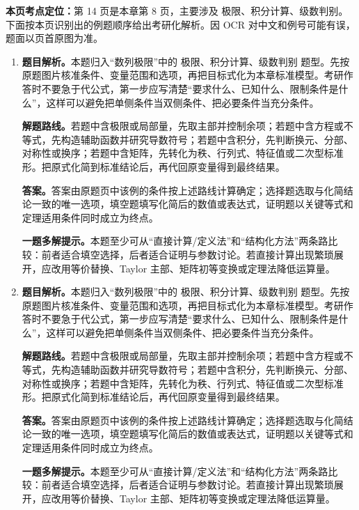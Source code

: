 \begin{solutionblock}
\textbf{本页考点定位：}第 14 页是本章第 8 页，主要涉及 极限、积分计算、级数判别。下面按本页识别出的例题顺序给出考研化解析。因 OCR 对中文和例号可能有误，题面以页首原图为准。

\begin{enumerate}[label=\textbf{例\arabic*.}, leftmargin=2.4em]

\item \textbf{题目解析。}本题归入“数列极限”中的 极限、积分计算、级数判别 题型。先按原题图片核准条件、变量范围和选项，再把目标式化为本章标准模型。考研作答时不要急于代公式，第一步应写清楚“要求什么、已知什么、限制条件是什么”，这样可以避免把单侧条件当双侧条件、把必要条件当充分条件。

\textbf{解题路线。}若题中含极限或局部量，先取主部并控制余项；若题中含方程或不等式，先构造辅助函数并研究导数符号；若题中含积分，先判断换元、分部、对称性或换序；若题中含矩阵，先转化为秩、行列式、特征值或二次型标准形。把原式化简到标准结论后，再代回原变量得到最终结果。

\textbf{答案。}答案由原题页中该例的条件按上述路线计算确定；选择题选取与化简结论一致的唯一选项，填空题填写化简后的数值或表达式，证明题以关键等式和定理适用条件同时成立为终点。

\textbf{一题多解提示。}本题至少可从“直接计算/定义法”和“结构化方法”两条路比较：前者适合填空选择，后者适合证明与参数讨论。若直接计算出现繁琐展开，应改用等价替换、Taylor 主部、矩阵初等变换或定理法降低运算量。

\item \textbf{题目解析。}本题归入“数列极限”中的 极限、积分计算、级数判别 题型。先按原题图片核准条件、变量范围和选项，再把目标式化为本章标准模型。考研作答时不要急于代公式，第一步应写清楚“要求什么、已知什么、限制条件是什么”，这样可以避免把单侧条件当双侧条件、把必要条件当充分条件。

\textbf{解题路线。}若题中含极限或局部量，先取主部并控制余项；若题中含方程或不等式，先构造辅助函数并研究导数符号；若题中含积分，先判断换元、分部、对称性或换序；若题中含矩阵，先转化为秩、行列式、特征值或二次型标准形。把原式化简到标准结论后，再代回原变量得到最终结果。

\textbf{答案。}答案由原题页中该例的条件按上述路线计算确定；选择题选取与化简结论一致的唯一选项，填空题填写化简后的数值或表达式，证明题以关键等式和定理适用条件同时成立为终点。

\textbf{一题多解提示。}本题至少可从“直接计算/定义法”和“结构化方法”两条路比较：前者适合填空选择，后者适合证明与参数讨论。若直接计算出现繁琐展开，应改用等价替换、Taylor 主部、矩阵初等变换或定理法降低运算量。

\end{enumerate}
\end{solutionblock}



